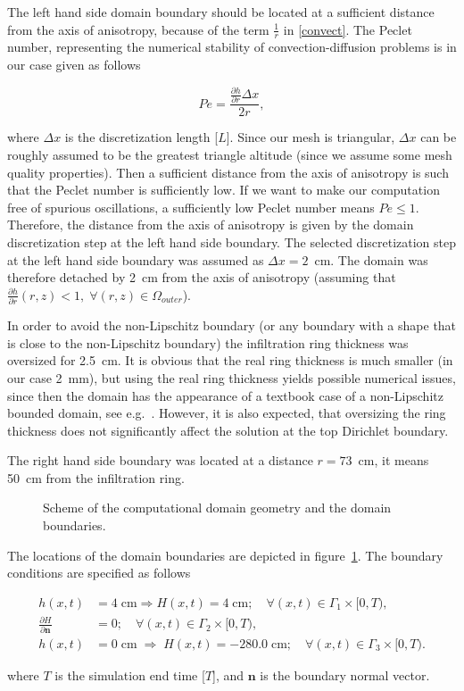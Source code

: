 \documentclass[review]{myarticle}
\newenvironment{lineq}
    {\begin{linenomath*}
    \begin{equation}
    }
    { 
    \end{equation} 
    \end{linenomath*}
    }
\renewcommand{\vec}{\mathbf}
\begin{document}
The left hand side domain boundary should be located at a sufficient distance from the axis of anisotropy, because of the term $\frac{1}{r}$ in \eqref{convect}. The Peclet number, representing the numerical stability of convection-diffusion problems is in our case given as follows
\begin{lineq}
Pe = \frac{\frac{\partial h}{\partial r} \Delta x}{2r},
\end{lineq}
where $\Delta x$ is the discretization length [$L$]. Since our mesh is triangular,  $\Delta x$ can be roughly assumed to be the greatest triangle altitude (since we assume some mesh quality properties). Then a sufficient distance from the axis of anisotropy is such that the Peclet number is sufficiently low. If we want to make our computation free of spurious oscillations, a sufficiently low Peclet number means $Pe\le 1$. Therefore, the distance from the axis of anisotropy is given by the domain discretization step at the left hand side boundary.  The selected discretization step at the left hand side boundary was assumed as $\Delta x=2$~cm. The domain was therefore detached by 2~cm from the axis of anisotropy (assuming that $\frac{\partial h}{\partial r} (r,z) < 1, \; \forall (r,z) \in \Omega_{outer}$).

In order to avoid the non-Lipschitz boundary (or any boundary with a shape that is close to the non-Lipschitz boundary) the infiltration ring thickness was oversized  for 2.5~cm. It is obvious that the real ring thickness is much smaller (in our case 2~mm), but using the real ring  thickness yields possible numerical issues, since then the domain has the appearance of a textbook case of  a non-Lipschitz bounded domain, see e.g.~\citep{fem}.  However, it is also expected, that oversizing the ring thickness does not significantly affect the solution at the top Dirichlet boundary. 

The right hand side boundary was located at a distance $r=73$~cm, it means 50~cm from the infiltration ring. 

 \begin{figure}
\centering
{}
 \caption{Scheme of the computational domain geometry and the domain boundaries.}
 \label{valecbc}
\end{figure}


The locations of the domain boundaries are depicted in figure~\ref{valecbc}. The boundary conditions are specified as follows
\begin{lineq} 
\begin{split}
h(x,t) &= 4 \; \mbox{cm} \Rightarrow H(x,t) = 4 \; \mbox{cm}; \quad \forall (x,t) \in \Gamma_1 \times [0,T), \\
\frac{\partial H}{\partial \vec{n}} &= 0; \quad \forall (x,t) \in \Gamma_2 \times [0,T), \\
h(x,t) &= 0  \; \mbox{cm}  \; \Rightarrow \; H(x,t) = -280.0  \; \mbox{cm}; \quad \forall (x,t) \in \Gamma_3 \times [0,T).
\end{split}
\end{lineq}
where $T$ is the simulation end time [$T$], and $\vec{n}$ is the boundary normal vector.
\end{document}
